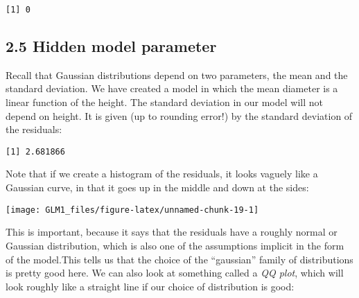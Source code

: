 \documentclass[
]{article}
\newenvironment{Shaded}{\begin{snugshade}}{\end{snugshade}}
\newcommand{\FunctionTok}[1]{\textcolor[rgb]{0.00,0.00,0.00}{#1}}
\newcommand{\NormalTok}[1]{#1}
\newcommand{\SpecialCharTok}[1]{\textcolor[rgb]{0.00,0.00,0.00}{#1}}
\begin{document}
\begin{verbatim}
[1] 0
\end{verbatim}

\hypertarget{hidden-model-parameter}{%
\subsection{2.5 Hidden model parameter}\label{hidden-model-parameter}}

Recall that Gaussian distributions depend on two parameters, the mean
and the standard deviation. We have created a model in which the mean
diameter is a linear function of the height. The standard deviation in
our model will not depend on height. It is given (up to rounding error!)
by the standard deviation of the residuals:

\begin{Shaded}
\end{Shaded}

\begin{verbatim}
[1] 2.681866
\end{verbatim}

Note that if we create a histogram of the residuals, it looks vaguely
like a Gaussian curve, in that it goes up in the middle and down at the
sides:

\begin{Shaded}
\end{Shaded}

\begin{center}\texttt{[image: GLM1\_files/figure-latex/unnamed-chunk-19-1]} \end{center}

This is important, because it says that the residuals have a roughly
normal or Gaussian distribution, which is also one of the assumptions
implicit in the form of the model.This tells us that the choice of the
``gaussian'' family of distributions is pretty good here. We can also
look at something called a \emph{QQ plot}, which will look roughly like
a straight line if our choice of distribution is good:

\begin{Shaded}
\end{Shaded}
\end{document}
